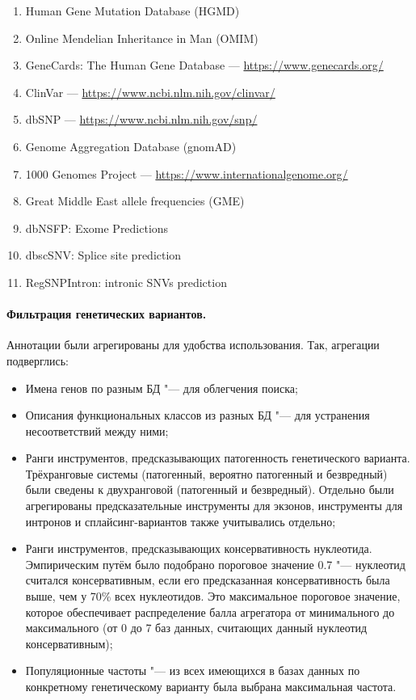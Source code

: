 \documentclass[a4paper,12pt]{article}
\begin{document}
\begin{enumerate}
\item Human Gene Mutation Database (HGMD\textregistered)\cite{hgmd}
\item Online Mendelian Inheritance in Man (OMIM\textregistered)\cite{omim}
\item GeneCards\textregistered: The Human Gene Database --- \href{https://www.genecards.org/}{https://www.genecards.org/}
\item ClinVar --- \href{https://www.ncbi.nlm.nih.gov/clinvar/}{https://www.ncbi.nlm.nih.gov/clinvar/}
\item dbSNP --- \href{https://www.ncbi.nlm.nih.gov/snp/}{https://www.ncbi.nlm.nih.gov/snp/}
\item Genome Aggregation Database (gnomAD)\cite{gnomad}
\item 1000 Genomes Project --- \href{https://www.internationalgenome.org/}{https://www.internationalgenome.org/}
\item Great Middle East allele frequencies (GME)\cite{gme}
\item dbNSFP: Exome Predictions\cite{dbnsfp}
\item dbscSNV: Splice site prediction\cite{dbscsnv}
\item RegSNPIntron: intronic SNVs prediction\cite{regsnpintron}
\end{enumerate}

\paragraph{Фильтрация генетических вариантов.}
Аннотации были агрегированы для удобства использования.
Так, агрегации подверглись:

\begin{itemize}
\item Имена генов по разным БД "--- для облегчения поиска;
\item Описания функциональных классов из разных БД "--- для устранения несоответствий между ними;
\item Ранги инструментов, предсказывающих патогенность генетического варианта.
Трёхранговые системы (патогенный, вероятно патогенный и безвредный) были сведены к двухранговой (патогенный и безвредный).
Отдельно были агрегированы предсказательные инструменты для экзонов, инструменты для интронов и сплайсинг-вариантов также учитывались отдельно;
\item Ранги инструментов, предсказывающих консервативность нуклеотида.
Эмпирическим путём было подобрано пороговое значение 0.7 "--- нуклеотид считался консервативным, если его предсказанная консервативность была выше, чем у 70\% всех нуклеотидов.
Это максимальное пороговое значение, которое обеспечивает распределение балла агрегатора от минимального до максимального (от 0 до 7 баз данных, считающих данный нуклеотид консервативным);
\item Популяционные частоты "--- из всех имеющихся в базах данных по конкретному генетическому варианту была выбрана максимальная частота.
\end{itemize}
\end{document}
